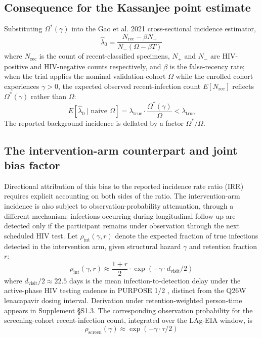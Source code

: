 \documentclass[12pt]{article}
\begin{document}
\subsection{Consequence for the Kassanjee point estimate}

Substituting $\Omega^*(\gamma)$ into the Gao et al. 2021 cross-sectional incidence estimator,
\begin{equation}
\hat{\lambda}_0 = \frac{N_{\mathrm{rec}} - \beta N_+}{N_- (\Omega - \beta T)}
\end{equation}
where $N_{\mathrm{rec}}$ is the count of recent-classified specimens, $N_+$ and $N_-$ are HIV-positive and HIV-negative counts respectively, and $\beta$ is the false-recency rate; when the trial applies the nominal validation-cohort $\Omega$ while the enrolled cohort experiences $\gamma > 0$, the expected observed recent-infection count $E[N_{\mathrm{rec}}]$ reflects $\Omega^*(\gamma)$ rather than $\Omega$:
\begin{equation}
E[\hat{\lambda}_0 \mid \text{naive } \Omega] = \lambda_{\mathrm{true}} \cdot \frac{\Omega^*(\gamma)}{\Omega} < \lambda_{\mathrm{true}}
\end{equation}
The reported background incidence is deflated by a factor $\Omega^*/\Omega$.

\subsection{The intervention-arm counterpart and joint bias factor}

Directional attribution of this bias to the reported incidence rate ratio (IRR) requires explicit accounting on both sides of the ratio. The intervention-arm incidence is also subject to observation-probability attenuation, through a different mechanism: infections occurring during longitudinal follow-up are detected only if the participant remains under observation through the next scheduled HIV test. Let $\rho_{\mathrm{int}}(\gamma, r)$ denote the expected fraction of true infections detected in the intervention arm, given structural hazard $\gamma$ and retention fraction $r$:
\begin{equation}
\rho_{\mathrm{int}}(\gamma, r) \approx \frac{1 + r}{2} \cdot \exp(-\gamma \cdot d_{\mathrm{visit}}/2)
\end{equation}
where $d_{\mathrm{visit}}/2 \approx 22.5$ days is the mean infection-to-detection delay under the active-phase HIV testing cadence in PURPOSE 1/2 \cite{bekker2024,kelley2025}, distinct from the Q26W lenacapavir dosing interval. Derivation under retention-weighted person-time appears in Supplement \S S1.3. The corresponding observation probability for the screening-cohort recent-infection count, integrated over the LAg-EIA window, is
\begin{equation}
\rho_{\mathrm{screen}}(\gamma) \approx \exp(-\gamma \cdot \tau / 2)
\end{equation}
\end{document}
